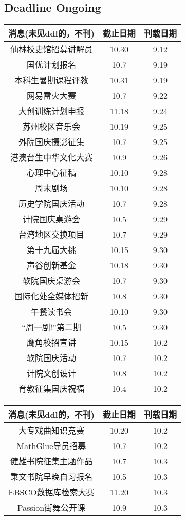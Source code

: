 \documentclass[letterpaper, 12pt]{article}
\begin{document}
\begin{multicols}{2}

\section{Deadline Ongoing}
\begin{tabular}{|c|c|c|}
    \hline
    消息(未见ddl的，不刊) & 截止日期 & 刊载日期\\
    \hline\hline
    仙林校史馆招募讲解员 & 10.30 & 9.12\\
    国优计划报名 & 10.7 & 9.19\\
    本科生暑期课程评教 & 10.31 & 9.19\\
    网易雷火大赛 & 10.7 & 9.22\\
    大创训练计划申报 & 11.18 & 9.24\\
    苏州校区音乐会 & 10.19 & 9.25\\
    外院国庆摄影征集 & 10.7 & 9.25\\
    港澳台生中华文化大赛 & 10.9 & 9.26\\
    心理中心征稿 & 10.10 & 9.28\\
    周末剧场 & 10.10 & 9.28\\
    历史学院国庆活动 & 10.7 & 9.28\\
    计院国庆桌游会 & 10.5 & 9.29\\
    台湾地区交换项目 & 10.7 & 9.29\\
    第十九届大挑 & 10.15 & 9.30\\
    声谷创新基金 & 10.18 & 9.30\\
    软院国庆桌游会 & 10.7 & 9.30\\
    国际化处全媒体招新 & 10.8 & 9.30\\
    午餐读书会 & 10.10 & 9.30\\
    “周一剧!”第二期 & 10.5 & 9.30\\
    鹰角校招宣讲 & 10.15 & 10.2\\
    软院国庆活动 & 10.7 & 10.2\\
    计院文创设计 & 10.8 & 10.2\\
    育教征集国庆祝福 & 10.4 & 10.2\\
    \hline
\end{tabular}
\begin{tabular}{|c|c|c|}
    \hline
    消息(未见ddl的，不刊) & 截止日期 & 刊载日期\\
    \hline\hline
    大专戏曲知识竞赛 & 10.20 & 10.2\\
    MathGlue导员招募 & 10.7 & 10.2\\
    健雄书院征集主题作品 & 10.7 & 10.3\\
    秉文书院早晚自习报名 & 10.5 & 10.3\\
    EBSCO数据库检索大赛 & 11.20 & 10.3\\
    Passion街舞公开课 & 10.9 & 10.3\\
    

\end{tabular}
\end{multicols}
\end{document}
